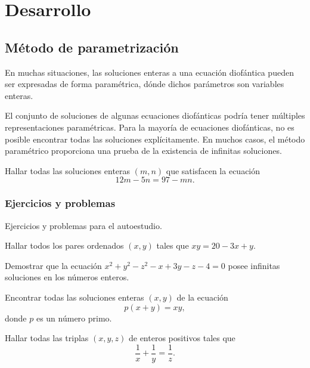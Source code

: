 \section{Desarrollo}

\subsection{Método de parametrización}

En muchas situaciones, las soluciones enteras a una ecuación diofántica pueden ser expresadas de forma paramétrica, dónde dichos parámetros son variables enteras.

El conjunto de soluciones de algunas ecuaciones diofánticas podría tener múltiples representaciones paramétricas.
Para la mayoría de ecuaciones diofánticas, no es posible encontrar todas las soluciones explícitamente.
En muchos casos, el método paramétrico proporciona una prueba de la existencia de infinitas soluciones.

\begin{example}
    Hallar todas las soluciones enteras $(m,n)$ que satisfacen la ecuación
    \[
        12m - 5n = 97 - mn.
    \]
\end{example}
\begin{solution}
\end{solution}

\subsubsection{Ejercicios y problemas}

Ejercicios y problemas para el autoestudio.

\begin{exercise}
    Hallar todos los pares ordenados $(x,y)$ tales que $xy = 20 - 3x + y$.
\end{exercise}

\begin{exercise}
    Demostrar que la ecuación $x^2 + y^2 - z^2 - x + 3y - z - 4 = 0$ posee infinitas soluciones en los números enteros.
\end{exercise}

\begin{exercise}
    Encontrar todas las soluciones enteras $(x,y)$ de la ecuación
    \[
        p(x + y) = xy,
    \]
    donde $p$ es un número primo.
\end{exercise}

\begin{exercise}
    Hallar todas las triplas $(x,y,z)$ de enteros positivos tales que
    \[
        \frac{1}{x} + \frac{1}{y} = \frac{1}{z}.
    \]
\end{exercise}

